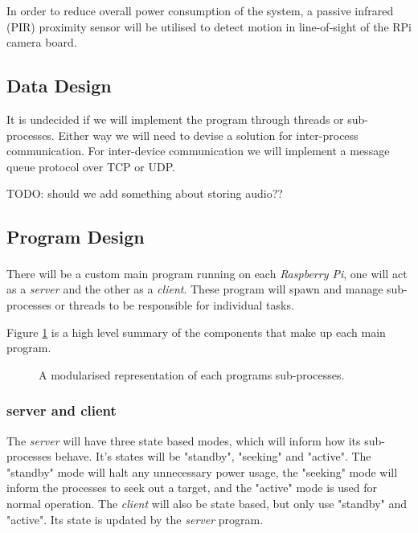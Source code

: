 \documentclass[11pt,a4paper,titlepage]{report}
\newcommand{\rpi}{\textit{Raspberry Pi\textsuperscript{\textregistered}}}
\begin{document}
In order to reduce overall power consumption of the system, a passive infrared (PIR) proximity sensor will be utilised to detect motion in line-of-sight of the RPi camera board. 

\subsection{Data Design}

It is undecided if we will implement the program through threads or sub-processes. Either way we will need to devise a solution for inter-process communication. For inter-device communication we will implement a message queue protocol over TCP or UDP.

{\color{red} TODO: should we add something about storing audio??}

\subsection{Program Design}

There will be a custom main program running on each \rpi, one will act as a \textit{server} and the other as a \textit{client}. These program will spawn and manage sub-processes or threads to be responsible for individual tasks.

Figure \ref{fig:processes} is a high level summary of the components that make up each main program.

\begin{figure}
\begin{multicols}{2}
\columnbreak
{}
\end{multicols}
\caption{A modularised representation of each programs sub-processes.}\label{fig:processes}
\end{figure}

\subsubsection{server and client}


The \textit{server} will have three state based modes, which will inform how its sub-processes behave. It's states will be "standby", "seeking" and "active". The "standby" mode will halt any unnecessary power usage, the "seeking" mode will inform the processes to seek out a target, and the "active" mode is used for normal operation. 
The \textit{client} will also be state based, but only use "standby" and "active". Its state is updated by the \textit{server} program.
\end{document}
